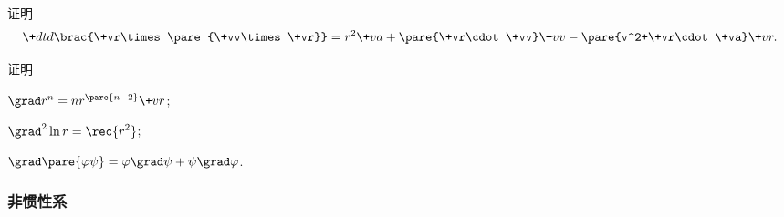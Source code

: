 \documentclass{ctexart}
\def\laplacian{\grad^2}
\begin{document}
\begin{cenum}
    \item 证明
    \[ \+dtd{}\brac{\+vr\times\pare{\+vv\times\+vr}} = r^2\+va + \pare{\+vr\cdot\+vv}\+vv - \pare{v^2+\+vr\cdot\+va}\+vr. \]
    \item 证明
    \begin{cenum}
        \item $\grad r^n = nr^{\pare{n-2}}\+vr$;
        \item $\laplacian \ln r = \displaystyle\rec{r^2}$;
        \item $\grad\pare{\varphi\psi} = \varphi\grad\psi + \psi\grad\varphi$.
    \end{cenum}
\end{cenum}


\subsubsection{非惯性系} %
\label{ssub:非惯性系}
\end{document}
